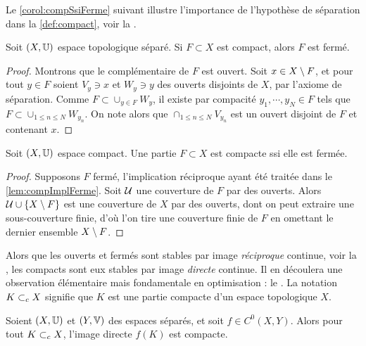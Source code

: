 Le \cref{corol:compSsiFerme} suivant illustre l'importance de l'hypothèse de séparation dans la \cref{def:compact}, voir la . 

\begin{lemma}
\label{lem:compImplFerme}
%
	Soit $(X,\mathbb{U})$ espace topologique séparé. Si $F\subset X$ est compact, alors $F$ est fermé.
\end{lemma}

\begin{proof}
Montrons que le complémentaire de $F$ est ouvert. Soit $x \in X \setminus F$, et pour tout $y \in F$ soient $V_y\ni x$ et $W_y \ni y$ des ouverts disjoints de $X$, par l'axiome de séparation.
Comme $F \subset \cup_{y\in F} W_y$, il existe par compacité $y_1,\cdots,y_N \in F$ tels que $F \subset \cup_{1 \leq n \leq N} W_{y_n}$. On note alors que $\cap_{1 \leq n \leq N} V_{y_n}$ est un ouvert disjoint de $F$ et contenant $x$.
\end{proof}

\begin{corollary}	
\label{corol:compSsiFerme}
%
	Soit $(X, \mathbb{U})$ espace compact. Une partie $F \subset X$ est compacte ssi elle est fermée. 
\end{corollary}

\begin{proof}
	Supposons $F$ fermé, l'implication réciproque ayant été traitée dans le \cref{lem:compImplFerme}. Soit $\mathcal{U}$ une couverture de $F$ par des ouverts. Alors $\mathcal{U} \cup \{X\setminus F\}$ est une couverture de $X$ par des ouverts, dont on peut extraire une sous-couverture finie, d'où l'on tire une couverture finie de $F$ en omettant le dernier ensemble $X \setminus F$. 
\end{proof}


Alors que les ouverts et fermés sont stables par image \emph{réciproque} continue, voir la , les compacts sont eux stables par image \emph{directe} continue.
Il en découlera une observation élémentaire mais fondamentale en optimisation : le . La notation $K \subset_c X$ signifie que $K$ est une partie compacte d'un espace topologique $X$. 

\begin{proposition}
\label{prop:compactImage}
%
	Soient $(X, \mathbb{U})$ et $(Y,\mathbb{V})$ des espaces séparés, et soit $f \in C^0(X,Y)$. 
	Alors pour tout $K \subset_c X$, l'image directe $f(K)$ est compacte. 
\end{proposition}

